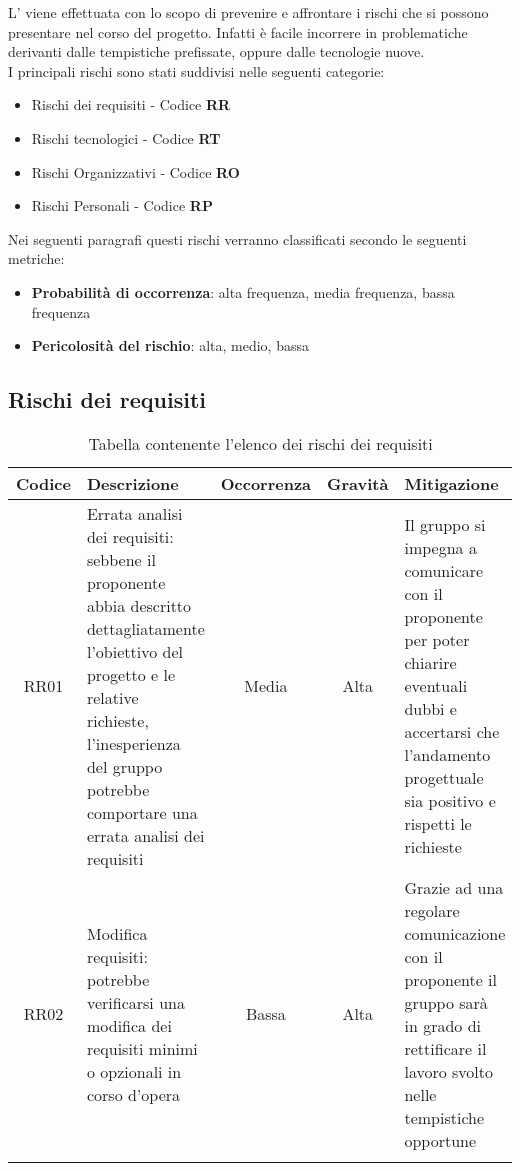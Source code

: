 \documentclass[../piano_di_progetto.tex]{subfiles}
\begin{document}
L’  viene effettuata con lo scopo di prevenire e affrontare i rischi che si possono presentare nel corso del progetto. Infatti è facile incorrere in problematiche derivanti dalle tempistiche prefissate, oppure dalle tecnologie nuove.\\
I principali rischi sono stati suddivisi nelle seguenti categorie:
\begin{itemize}
	\item Rischi dei requisiti - Codice \textbf{RR}
	\item Rischi tecnologici  - Codice \textbf{RT}
	\item Rischi Organizzativi - Codice \textbf{RO}
	\item Rischi Personali - Codice \textbf{RP}
\end{itemize}
Nei seguenti paragrafi questi rischi verranno classificati secondo le seguenti metriche:
\begin{itemize}
	\item \textbf{Probabilità di occorrenza}: alta frequenza, media frequenza, bassa frequenza
	\item \textbf{Pericolosità del rischio}: alta, medio, bassa
\end{itemize}

\subsection{Rischi dei requisiti}%
\label{sub:rischi_req}

\begin{center}
	\begin{longtable}{|c|p{4.5cm}|c|c|p{4.5cm}|}
		\hline
		\rowcolor{lightgray}
		{\textbf{Codice}} & {\textbf{Descrizione}} & {\textbf{Occorrenza}} & {\textbf{Gravità}} & {\textbf{Mitigazione}}                                                     \\

		\hline
		RR01              &
		Errata analisi dei requisiti: sebbene il proponente abbia descritto dettagliatamente l’obiettivo del progetto e le relative richieste, l’inesperienza del gruppo potrebbe comportare una errata analisi dei requisiti
		                  &
		Media
		                  &
		Alta
		                  &
		Il gruppo si impegna a comunicare con il proponente per poter chiarire eventuali dubbi e accertarsi che l’andamento progettuale sia positivo e rispetti le richieste \\

		RR02              &
		Modifica requisiti: potrebbe verificarsi una modifica dei requisiti minimi o opzionali in corso d’opera
		                  &
		Bassa
		                  &
		Alta
		                  &
		Grazie ad una regolare comunicazione con il proponente il gruppo sarà in grado di rettificare il lavoro svolto nelle tempistiche opportune                           \\
		\hline
		\rowcolor{white}
		\caption{Tabella contenente l'elenco dei rischi dei requisiti}
	\end{longtable}

\end{center}
\end{document}
